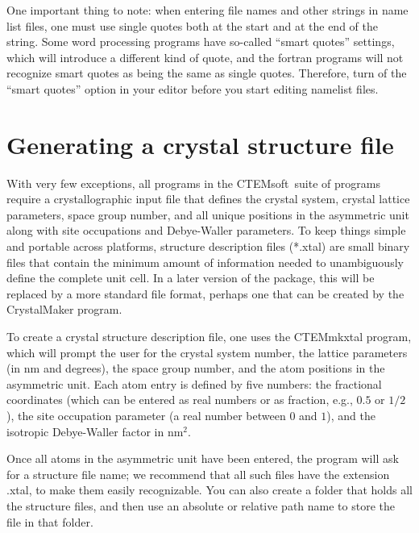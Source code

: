 \documentclass[DIV=calc, paper=letter, fontsize=11pt]{scrartcl}	 %
\newcommand{\ctp}{\textsf{CTEMsoft}}
\begin{document}
One important thing to note: when entering file names and other strings in name list files, one must use single quotes both at the start and at 
the end of the string.  Some word processing programs have so-called ``smart quotes'' settings, which will introduce a different kind of quote,
and the fortran programs will not recognize smart quotes as being the same as single quotes.  Therefore, turn of the ``smart quotes'' option
in your editor before you start editing namelist files.


\section{Generating a crystal structure file\label{sec:f90input5}}

With very few exceptions, all programs in the \ctp\ suite of programs require a crystallographic input file that defines the 
crystal system, crystal lattice parameters, space group number, and all unique positions in the 
asymmetric unit along with site occupations and Debye-Waller parameters.  To keep things simple and 
portable across platforms, structure description files (*.xtal) are small binary files that contain the minimum
amount of information needed to unambiguously define the complete unit cell.  In a later version of the package, this
will be replaced by a more standard file format, perhaps one that can be created by the CrystalMaker program.

To create a crystal structure description file, one uses the \textsf{CTEMmkxtal} program, which will prompt
the user for the crystal system number, the lattice parameters (in nm and degrees), the space group number,
and the atom positions in the asymmetric unit.  Each atom entry is defined by five numbers: the fractional
coordinates (which can be entered as real numbers or as fraction, e.g., $0.5$ or $1/2$), the site 
occupation parameter (a real number between $0$ and $1$), and the isotropic Debye-Waller factor in nm$^{2}$.

Once all atoms in the asymmetric unit have been entered, the program will ask for a structure file name; we
recommend that all such files have the extension \textsf{.xtal}, to make them easily recognizable.  You can also
create a folder that holds all the structure files, and then use an absolute or relative path name to store 
the file in that folder.
\end{document}

